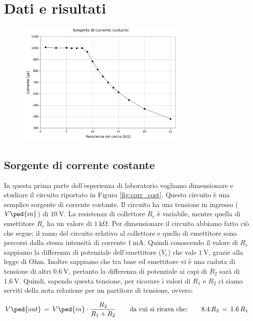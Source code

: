 \section*{Dati e risultati}

\begin{figure}
	\centering
	\includegraphics[width=0.75\textwidth]{current.pdf}
	\caption{}
	\label{fig:curr}
\end{figure}

\subsection*{Sorgente di corrente costante}

In questa prima parte dell'esperienza di laboratorio vogliamo dimensionare e studiare il circuito riportato in Figura \ref{fig:corr_cost}. Questo circuito è una semplice sorgente di corrente costante. Il circuito ha una tensione in ingresso ($V\ped{in}$) di $\SI{10}{\volt}$. La resistenza di collettore $R_c$ è variabile, mentre quella di emettitore $R_e$ ha un valore di $\SI{1}{\kilo\ohm}$.
Per dimensionare il circuito abbiamo fatto ciò che segue; il ramo del circuito relativo al collettore e quello di emettitore sono percorsi dalla stessa intensità di corrente $\SI{1}{\milli\ampere}$. Quindi conoscendo il valore di $R_e$ sappiamo la differenza di potenziale dell'emettitore ($V_e$) che vale $\SI{1}{\volt}$, grazie alla legge di Ohm. Inoltre sappiamo che tra base ed emettitore vi è una caduta di tensione di altri $\SI{0.6}{\volt}$, pertanto la differenza di potenziale ai capi di $R_2$ sarà di $\SI{1.6}{\volt}$.
Quindi, sapendo questa tensione, per ricavare i valori di $R_1$ e $R_2$ ci siamo serviti della nota relazione per un partitore di tensione, ovvero:

\begin{equation}
	V\ped{out} \,=\, V\ped{in}\cdot\frac{R_2}{R_1+R_2} \qquad\text{da cui si ricava che:}\qquad 8.4\,R_2\,=\,1.6\,R_1
\end{equation}

